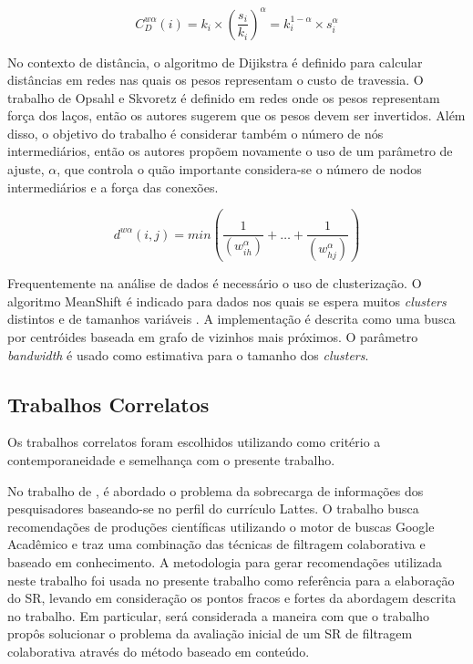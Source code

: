 \documentclass[12pt]{article}
\begin{document}
\begin{equation} \label{eqn:centrality} 
 C_D ^{w \alpha} (i) = k_i \times \left( \frac {s_i} {k_i} \right) ^{\alpha} = k_i ^{1 - \alpha} \times s _i ^{\alpha}
\end{equation}

No contexto de distância, o algoritmo de Dijikstra \cite{dijkstra1959note} é definido para calcular distâncias em redes nas quais os pesos representam o custo de travessia. O trabalho de Opsahl e Skvoretz \cite{opsahl2010node} é definido em redes onde os pesos representam força dos laços, então os autores sugerem que os pesos devem ser invertidos. Além disso, o objetivo do trabalho é considerar também o número de nós intermediários, então os autores propõem novamente o uso de um parâmetro de ajuste, $\alpha$, que controla o quão importante considera-se o número de nodos intermediários e a força das conexões.

\begin{equation} \label{eqn:distance}
  d^{w\alpha}(i, j) = min \left( \frac{1}{ \left( w_{ih}^{\alpha} \right) } + \dots + \frac{1}{ \left( w_{hj}^{\alpha} \right) }  \right) 
\end{equation}

Frequentemente na análise de dados é necessário o uso de clusterização. O algoritmo MeanShift é indicado para dados nos quais se espera muitos \textit{clusters} distintos e de tamanhos variáveis \cite{scikit-learn}. A implementação é descrita como uma busca por centróides baseada em grafo de vizinhos mais próximos. O parâmetro \textit{bandwidth} é usado como estimativa para o tamanho dos \textit{clusters}.

\subsection{Trabalhos Correlatos}

Os trabalhos correlatos foram escolhidos utilizando como critério a contemporaneidade e semelhança com o presente trabalho.

No trabalho de \cite{da2018desenvolvimento}, é abordado o problema da sobrecarga de informações dos pesquisadores baseando-se no perfil do currículo Lattes. O trabalho busca recomendações de produções científicas utilizando o motor de buscas Google Acadêmico e traz uma combinação das técnicas de filtragem colaborativa e baseado em conhecimento. A metodologia para gerar recomendações utilizada neste trabalho foi usada no presente trabalho como referência para a elaboração do SR, levando em consideração os pontos fracos e fortes da abordagem descrita no trabalho. Em particular, será considerada a maneira com que o trabalho propôs solucionar o problema  da avaliação inicial de um SR de filtragem colaborativa através do método baseado em conteúdo.
\end{document}
